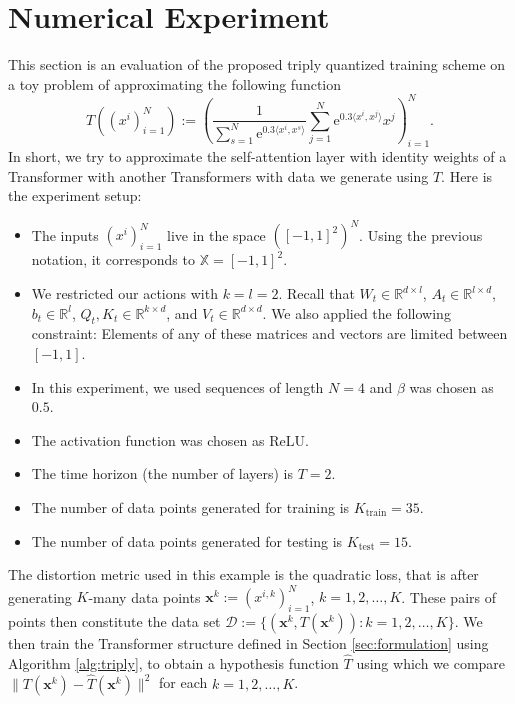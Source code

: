 \documentclass[11pt]{article}
\newcommand{\RR}{\mathbb{R}}
\newcommand{\XX}{\mathbb{X}}
\newcommand{\cD}{\mathcal{D}}
\newcommand{\e}{\mathrm{e}} %
\begin{document}
\section{Numerical Experiment}
This section is an evaluation of the proposed triply quantized training scheme on a toy problem of approximating the following function
\begin{equation*}
    T((x^i)_{i=1}^N) := \left(\dfrac{1}{\sum_{s=1}^N\e^{0.3\langle x^i, x^s\rangle}}\sum_{j=1}^{N}\e^{0.3\langle x^i, x^j\rangle}x^j\right)_{i=1}^N.
\end{equation*}
In short, we try to approximate the self-attention layer with identity weights of a Transformer with another Transformers with data we generate using $T$. Here is the experiment setup:
\begin{itemize}
    \item The inputs $(x^i)_{i=1}^N$ live in the space $([-1,1]^2)^N$. Using the previous notation, it corresponds to $\XX = [-1,1]^2$.
    \item We restricted our actions with $k = l = 2$. Recall that $W_t\in\RR^{d\times l}$, $A_t\in\RR^{l\times d}$, $b_t\in\RR^l$, $Q_t, K_t\in\RR^{k\times d}$, and $V_t\in\RR^{d\times d}$. We also applied the following constraint: Elements of any of these matrices and vectors are limited between $[-1,1]$.
    \item In this experiment, we used sequences of length $N=4$ and $\beta$ was chosen as $0.5$.
    \item The activation function was chosen as $\mathrm{ReLU}$.
    \item The time horizon (the number of layers) is $T=2$. 
    \item The number of data points generated for training is $K_{\text{train}} = 35$.
    \item The number of data points generated for testing is $K_{\text{test}} = 15$.
\end{itemize}

The distortion metric used in this example is the quadratic loss, that is after generating $K$-many data points $\bm{x}^k := (x^{i,k})_{i=1}^N$, $k=1,2,\ldots,K$. These pairs of points then constitute the data set $\cD := \{(\mathbf{x}^k, T(\mathbf{x}^k)) : k =1,2,\ldots,K\}$. We then train the Transformer structure defined in Section \ref{sec:formulation} using Algorithm \ref{alg:triply}, to obtain a hypothesis function $\hat{T}$ using which we compare $\|T(\mathbf{x}^k) - \hat{T}(\mathbf{x}^k)\|^2$ for each $k=1,2,\ldots,K$.
\end{document}
